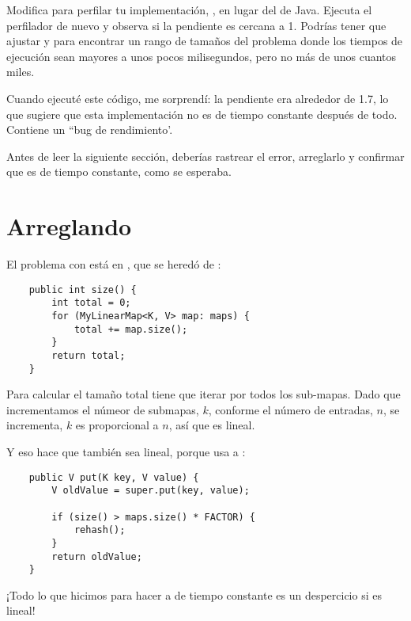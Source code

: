 \documentclass[12pt]{book}
\theoremstyle{exercise}
\begin{document}
Modifica  para perfilar tu implementación,
, en lugar del  de Java. Ejecuta el
perfilador de nuevo y observa si la pendiente es cercana a 1. Podrías
tener que ajustar  y  para encontrar un rango
de tamaños del problema donde los tiempos de ejecución sean mayores a unos
pocos milisegundos, pero no más de unos cuantos miles.

Cuando ejecuté este código, me sorprendí: la pendiente era alrededor de 1.7,
lo que sugiere que esta implementación no es de tiempo constante después de
todo. Contiene un ``bug de rendimiento'. 


Antes de leer la siguiente sección, deberías rastrear el error, arreglarlo
y confirmar que  es de tiempo constante, como se esperaba.


\section{Arreglando }
\label{fixing-myhashmap}


El problema con  está en , que se
heredó de :

\begin{verbatim}
    public int size() {
        int total = 0;
        for (MyLinearMap<K, V> map: maps) {
            total += map.size();
        }
        return total;
    }
\end{verbatim}

Para calcular el tamaño total tiene que iterar por todos los sub-mapas. 
Dado que incrementamos el númeor de submapas, $k$, conforme el número
de entradas, $n$, se incrementa, $k$ es proporcional a $n$, así que
 es lineal.


Y eso hace que  también sea lineal, porque usa a :

\begin{verbatim}
    public V put(K key, V value) {
        V oldValue = super.put(key, value);

        if (size() > maps.size() * FACTOR) {
            rehash();
        }
        return oldValue;
    }
\end{verbatim}

¡Todo lo que hicimos para hacer a  de tiempo constante es un despercicio
si  es lineal!
\end{document}
